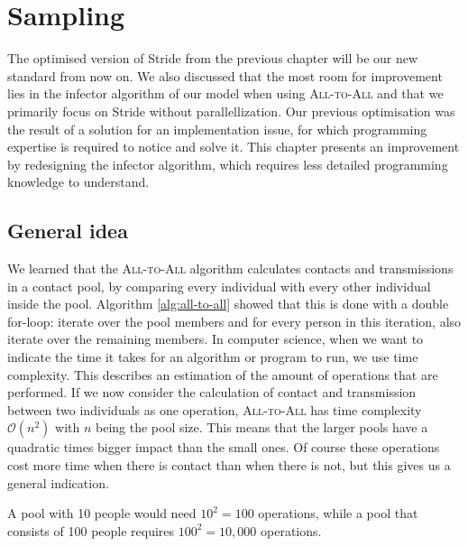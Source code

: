 \chapter{Sampling}
\label{chapter:sampling}
The optimised version of Stride from the previous chapter will be our new standard from now on. We also discussed that the most room for improvement lies in the infector algorithm of our model when using \textsc{All-to-All} and that we primarily focus on Stride without parallellization. Our previous optimisation was the result of a solution for an implementation issue, for which programming expertise is required to notice and solve it. This chapter presents an improvement by redesigning the infector algorithm, which requires less detailed programming knowledge to understand.

\section{General idea}
\label{sec:general_idea}
We learned that the \textsc{All-to-All} algorithm calculates contacts and transmissions in a contact pool, by comparing every individual with every other individual inside the pool. Algorithm \ref{alg:all-to-all} showed that this is done with a double for-loop: iterate over the pool members and for every person in this iteration, also iterate over the remaining members. In computer science, when we want to indicate the time it takes for an algorithm or program to run, we use time complexity. This describes an estimation of the amount of operations that are performed. If we now consider the calculation of contact and transmission between two individuals as one operation, \textsc{All-to-All} has time complexity $\mathcal{O}(n^{2})$ with $n$ being the pool size. This means that the larger pools have a quadratic times bigger impact than the small ones. Of course these operations cost more time when there is contact than when there is not, but this gives us a general indication.

\begin{example}
\label{example:quadratic_complexity}
A pool with 10 people would need $10^{2} = 100$ operations, while a pool that consists of 100 people requires $100^{2} = 10,000$ operations.
\end{example}

